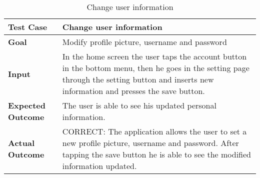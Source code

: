 \begin{table}[H]
	\centering
	\begin{tabular}{|l|l|}
	\hline
	\textbf{Test Case}& Change user information\\
	\hline
	\textbf{Goal}& Modify profile picture, username and password\\
	\hline
	\textbf{Input}& 
	\begin{minipage}{.7\linewidth}
	In the home screen the user taps the account button in the bottom menu, then he goes in the setting page through the setting button and inserts new information and presses the save button.
	\end{minipage}\\
	\hline
	\textbf{Expected Outcome}& The user is able to see his updated personal information.\\
	\hline
	\textbf{Actual Outcome}& 
	\begin{minipage}{.7\linewidth}
	CORRECT: The application allows the user to set a new profile picture, username and password. After tapping the save button he is able to see the modified information updated.
	\end{minipage}\\
	\hline	
	\end{tabular}
	\caption{Change user information}
\end{table}
